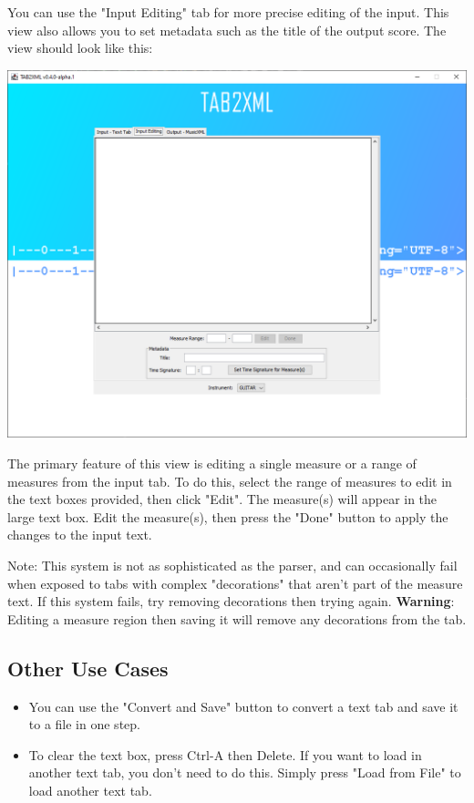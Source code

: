 \documentclass[11pt]{article}
\begin{document}
You can use the "Input Editing" tab for more precise editing of the input.  This view also allows you to set metadata such as the title of the output score.  The view should look like this:
\begin{center}
\includegraphics[width=.9\linewidth]{../Screenshots/input-editing-tabbedview-0.4.0.png}
\end{center}
The primary feature of this view is editing a single measure or a range of measures from the input tab.  To do this, select the range of measures to edit in the text boxes provided, then click "Edit".  The measure(s) will appear in the large text box.  Edit the measure(s), then press the "Done" button to apply the changes to the input text.

Note: This system is not as sophisticated as the parser, and can occasionally fail when exposed to tabs with complex "decorations" that aren't part of the measure text.  If this system fails, try removing decorations then trying again.
\textbf{Warning}: Editing a measure region then saving it will remove any decorations from the tab.
\subsection{Other Use Cases}
\label{sec:org4e2d675}
\begin{itemize}
\item You can use the "Convert and Save" button to convert a text tab and save it to a file in one step.
\item To clear the text box, press Ctrl-A then Delete.  If you want to load in another text tab, you don't need to do this.  Simply press "Load from File" to load another text tab.
\end{itemize}
\end{document}
